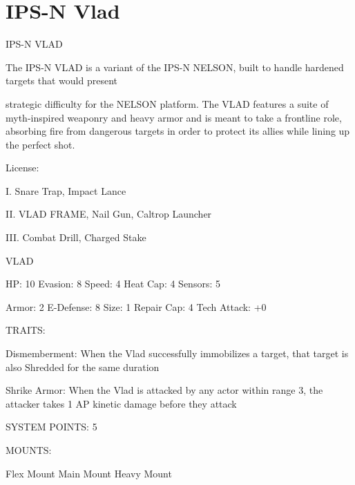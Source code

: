 \section{IPS-N Vlad}
                                                                 
                                                     IPS-N VLAD  

The IPS-N VLAD is a variant of the IPS-N NELSON, built to handle hardened targets that would present  

strategic difficulty for the NELSON platform. The VLAD features a suite of myth-inspired weaponry and  
heavy armor and is meant to take a frontline role, absorbing fire from dangerous targets in order to protect  
its allies while lining up the perfect shot.   

                                                                                                                          


                                                      License:
 
I. Snare Trap, Impact Lance
 
II. VLAD FRAME, Nail Gun, Caltrop Launcher
 
III. Combat Drill, Charged Stake
 

                                                       VLAD 

  HP: 10          Evasion: 8                              Speed: 4            Heat Cap: 4         Sensors: 5 

  Armor: 2        E-Defense: 8                            Size: 1             Repair Cap: 4       Tech Attack:  
                                                                                                  +0 

                                                      TRAITS: 

  Dismemberment: When the Vlad successfully immobilizes a target, that target is also Shredded for the  
  same duration
 
  Shrike Armor: When the Vlad is attacked by any actor within range 3, the attacker takes 1 AP kinetic  
  damage before they attack 

                                                SYSTEM POINTS: 5 

                                                      MOUNTS: 

  Flex Mount                          Main Mount                               Heavy Mount 


